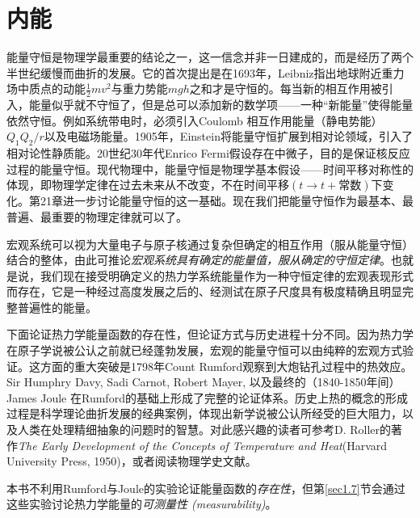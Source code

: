\section{内能}
\label{sec1.4}
能量守恒是物理学最重要的结论之一，这一信念并非一日建成的，而是经历了两个半世纪缓慢而曲折的发展。它的首次提出是在1693年，Leibniz指出地球附近重力场中质点的动能$\frac{1}{2} m v^2$与重力势能$mgh$之和才是守恒的。每当新的相互作用被引入，能量似乎就不守恒了，但是总可以添加新的数学项——一种“新能量”使得能量依然守恒。例如系统带电时，必须引入{Coulomb 相互作用能量}（静电势能）$Q_1 Q_2 / r$以及电磁场能量。1905年，Einstein将能量守恒扩展到相对论领域，引入了相对论性静质能。20世纪30年代Enrico Fermi假设存在中微子，目的是保证核反应过程的能量守恒。现代物理中，能量守恒是物理学基本假设——时间平移对称性的体现，即物理学定律在过去未来从不改变，不在时间平移$(t \to t + \text{常数})$下变化。第21章进一步讨论能量守恒的这一基础。现在我们把能量守恒作为最基本、最普遍、最重要的物理定律就可以了。

宏观系统可以视为大量电子与原子核通过复杂但确定的相互作用（服从能量守恒）结合的整体，由此可推论{\it 宏观系统具有确定的能量值，服从确定的守恒定律}。也就是说，我们现在接受明确定义的热力学系统能量作为一种守恒定律的宏观表现形式而存在，它是一种经过高度发展之后的、经测试在原子尺度具有极度精确且明显完整普遍性的能量。

下面论证热力学能量函数的存在性，但论证方式与历史进程十分不同。因为热力学在原子学说被公认之前就已经蓬勃发展，宏观的能量守恒可以由纯粹的宏观方式验证。这方面的重大突破是1798年Count Rumford观察到大炮钻孔过程中的热效应。Sir Humphry Davy, Sadi Carnot, Robert Mayer, 以及最终的（1840-1850年间）James Joule 在Rumford的基础上形成了完整的论证体系。历史上热的概念的形成过程是科学理论曲折发展的经典案例，体现出新学说被公认所经受的巨大阻力，以及人类在处理精细抽象的问题时的智慧。对此感兴趣的读者可参考D. Roller的著作{\it The Early Development of the Concepts of Temperature and Heat}(Harvard University Press, 1950)，或者阅读物理学史文献。

本书不利用Rumford与Joule的实验论证能量函数的{\it 存在性}，但第\ref{sec1.7}节会通过这些实验讨论热力学能量的{\it 可测量性 (measurability)}。

